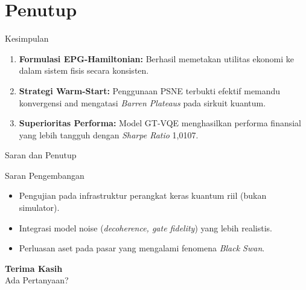 \documentclass[aspectratio=169]{beamer}
\begin{document}
\section{Penutup}

\begin{frame}{Kesimpulan}
    \begin{enumerate}
        \item \textbf{Formulasi EPG-Hamiltonian:} Berhasil memetakan utilitas ekonomi ke dalam sistem fisis secara konsisten.
        \item \textbf{Strategi Warm-Start:} Penggunaan PSNE terbukti efektif memandu konvergensi and mengatasi \textit{Barren Plateaus} pada sirkuit kuantum.
        \item \textbf{Superioritas Performa:} Model GT-VQE menghasilkan performa finansial yang lebih tangguh dengan \textit{Sharpe Ratio} 1,0107.
    \end{enumerate}
\end{frame}

\begin{frame}{Saran  dan   Penutup}
    \begin{block}{Saran Pengembangan}
        \begin{itemize}
            \item Pengujian pada infrastruktur perangkat keras kuantum riil (bukan simulator).
            \item Integrasi model noise (\textit{decoherence, gate fidelity}) yang lebih realistis.
            \item Perluasan aset pada pasar yang mengalami fenomena \textit{Black Swan}.
        \end{itemize}
    \end{block}
    \vspace{1cm}
    \begin{center}
        \huge \textbf{Terima Kasih} \\
        \medskip
        \large Ada Pertanyaan?
    \end{center}
\end{frame}
\end{document}
